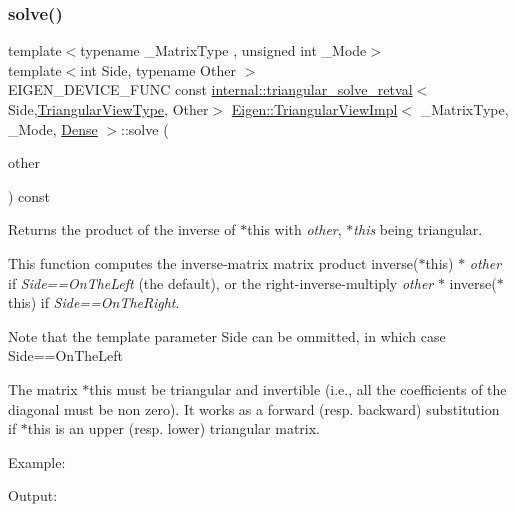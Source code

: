 \subsubsection{\texorpdfstring{solve()}{solve()}}
{\footnotesize\ttfamily template$<$typename \+\_\+\+Matrix\+Type , unsigned int \+\_\+\+Mode$>$ \\
template$<$int Side, typename Other $>$ \\
E\+I\+G\+E\+N\+\_\+\+D\+E\+V\+I\+C\+E\+\_\+\+F\+U\+NC const \mbox{\hyperlink{struct_eigen_1_1internal_1_1triangular__solve__retval}{internal\+::triangular\+\_\+solve\+\_\+retval}}$<$Side,\mbox{\hyperlink{class_eigen_1_1_triangular_view}{Triangular\+View\+Type}}, Other$>$ \mbox{\hyperlink{class_eigen_1_1_triangular_view_impl}{Eigen\+::\+Triangular\+View\+Impl}}$<$ \+\_\+\+Matrix\+Type, \+\_\+\+Mode, \mbox{\hyperlink{struct_eigen_1_1_dense}{Dense}} $>$\+::solve (\begin{DoxyParamCaption}\item[{const \mbox{\hyperlink{class_eigen_1_1_matrix_base}{Matrix\+Base}}$<$ Other $>$ \&}]{other }\end{DoxyParamCaption}) const\hspace{0.3cm}{\ttfamily [inline]}}

\begin{DoxyReturn}{Returns}
the product of the inverse of {\ttfamily $\ast$this} with {\itshape other}, {\itshape $\ast$this} being triangular.
\end{DoxyReturn}
This function computes the inverse-\/matrix matrix product inverse({\ttfamily $\ast$this}) $\ast$ {\itshape other} if {\itshape Side==On\+The\+Left} (the default), or the right-\/inverse-\/multiply {\itshape other} $\ast$ inverse({\ttfamily $\ast$this}) if {\itshape Side==On\+The\+Right}.

Note that the template parameter {\ttfamily Side} can be ommitted, in which case {\ttfamily Side==On\+The\+Left} 

The matrix {\ttfamily $\ast$this} must be triangular and invertible (i.\+e., all the coefficients of the diagonal must be non zero). It works as a forward (resp. backward) substitution if {\ttfamily $\ast$this} is an upper (resp. lower) triangular matrix.

Example\+: 
\begin{DoxyCodeInclude}{0}
\end{DoxyCodeInclude}
 Output\+: 
\begin{DoxyVerbInclude}
\end{DoxyVerbInclude}



